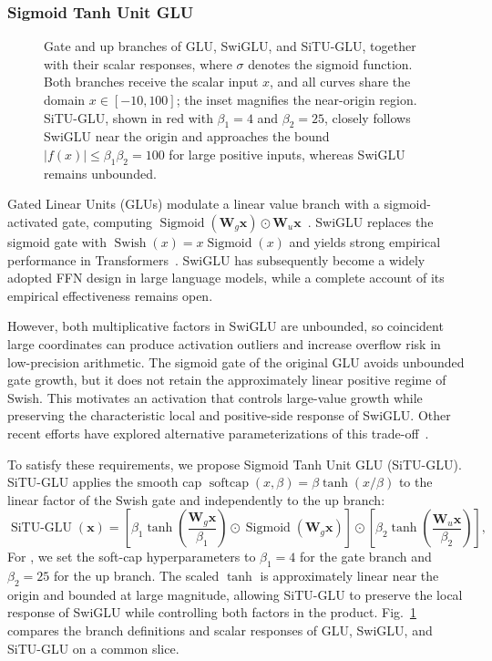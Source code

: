 \subsubsection{Sigmoid Tanh Unit GLU}
\label{sec:situ}
\begin{figure}[t]
    \centering
    
    \caption{Gate and up branches of GLU, SwiGLU, and SiTU-GLU, together with their scalar responses, where $\sigma$ denotes the sigmoid function.
        Both branches receive the scalar input $x$, and all curves share the domain $x\in[-10,100]$; the inset magnifies the near-origin region.
        SiTU-GLU, shown in red with $\beta_1=4$ and $\beta_2=25$, closely follows SwiGLU near the origin and approaches the bound $|f(x)|\leq\beta_1\beta_2=100$ for large positive inputs, whereas SwiGLU remains unbounded.}
    \label{fig:situglu}
\end{figure}
Gated Linear Units (GLUs) modulate a linear value branch with a sigmoid-activated gate, computing $\operatorname{Sigmoid}(\mathbf{W}_g\bm{x})\odot\mathbf{W}_u\bm{x}$~\citep{dauphin2017language}.
SwiGLU replaces the sigmoid gate with $\operatorname{Swish}(x)=x\operatorname{Sigmoid}(x)$ and yields strong empirical performance in Transformers~\citep{shazeer2020glu}.
SwiGLU has subsequently become a widely adopted FFN design in large language models, while a complete account of its empirical effectiveness remains open.

However, both multiplicative factors in SwiGLU are unbounded, so coincident large coordinates can produce activation outliers and increase overflow risk in low-precision arithmetic.
The sigmoid gate of the original GLU avoids unbounded gate growth, but it does not retain the approximately linear positive regime of Swish.
This motivates an activation that controls large-value growth while preserving the characteristic local and positive-side response of SwiGLU.
Other recent efforts have explored alternative parameterizations of this trade-off~\citep{jiang2026powlu}.

To satisfy these requirements, we propose Sigmoid Tanh Unit GLU (SiTU-GLU).
SiTU-GLU applies the smooth cap $\operatorname{softcap}(x,\beta)=\beta\tanh(x/\beta)$ to the linear factor of the Swish gate and independently to the up branch:
\begin{equation}
    \operatorname{SiTU\text{-}GLU}(\bm{x})
    = \left[\beta_1\tanh\!\left(\frac{\mathbf{W}_g\bm{x}}{\beta_1}\right)\odot\operatorname{Sigmoid}(\mathbf{W}_g\bm{x})\right]
    \odot \left[\beta_2\tanh\!\left(\frac{\mathbf{W}_u\bm{x}}{\beta_2}\right)\right],
    \label{eq:situglu}
\end{equation}
For , we set the soft-cap hyperparameters to $\beta_1=4$ for the gate branch and $\beta_2=25$ for the up branch.
The scaled $\tanh$ is approximately linear near the origin and bounded at large magnitude, allowing SiTU-GLU to preserve the local response of SwiGLU while controlling both factors in the product.
Fig.~\ref{fig:situglu} compares the branch definitions and scalar responses of GLU, SwiGLU, and SiTU-GLU on a common slice.

